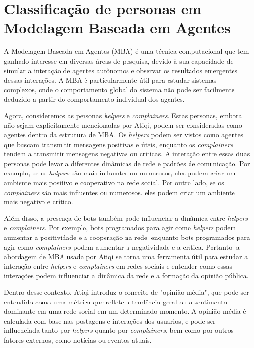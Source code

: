 \section{Classificação de personas em Modelagem Baseada em Agentes}

A Modelagem Baseada em Agentes (MBA) é uma técnica computacional que tem ganhado interesse em diversas áreas de pesquisa, devido à sua capacidade de simular a interação de agentes autônomos e observar os resultados emergentes dessas interações. A MBA é particularmente útil para estudar sistemas complexos, onde o comportamento global do sistema não pode ser facilmente deduzido a partir do comportamento individual dos agentes.

Agora, consideremos as personas \textit{helpers} e \textit{complainers}. Estas personas, embora não sejam explicitamente mencionadas por Atiqi, podem ser consideradas como agentes dentro da estrutura de MBA. Os \textit{helpers} podem ser vistos como agentes que buscam transmitir mensagens positivas e úteis, enquanto os \textit{complainers} tendem a transmitir mensagens negativas ou críticas. A interação entre essas duas personas pode levar a diferentes dinâmicas de rede e padrões de comunicação. Por exemplo, se os \textit{helpers} são mais influentes ou numerosos, eles podem criar um ambiente mais positivo e cooperativo na rede social. Por outro lado, se os \textit{complainers} são mais influentes ou numerosos, eles podem criar um ambiente mais negativo e crítico. 

Além disso, a presença de bots também pode influenciar a dinâmica entre \textit{helpers} e \textit{complainers}. Por exemplo, bots programados para agir como \textit{helpers} podem aumentar a positividade e a cooperação na rede, enquanto bots programados para agir como \textit{complainers} podem aumentar a negatividade e a crítica. Portanto, a abordagem de MBA usada por Atiqi se torna uma ferramenta útil para estudar a interação entre \textit{helpers} e \textit{complainers} em redes sociais e entender como essas interações podem influenciar a dinâmica da rede e a formação da opinião pública.

Dentro desse contexto, Atiqi introduz o conceito de "opinião média", que pode ser entendido como uma métrica que reflete a tendência geral ou o sentimento dominante em uma rede social em um determinado momento. A opinião média é calculada com base nas postagens e interações dos usuários, e pode ser influenciada tanto por \textit{helpers} quanto por \textit{complainers}, bem como por outros fatores externos, como notícias ou eventos atuais.

